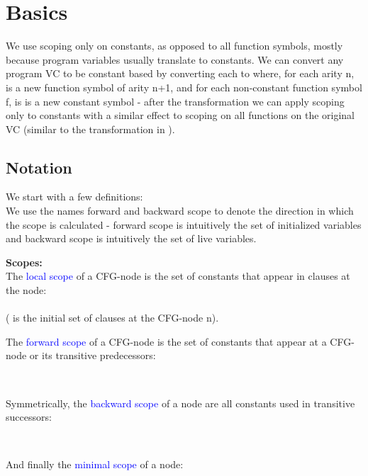 \section{Basics}
We use scoping only on constants, as opposed to all function symbols, mostly because program variables usually translate to constants.
We can convert any program VC to be constant based by converting each  to  where, for each arity n,  is a new function symbol of arity n+1, and for each non-constant function symbol f,  is is a new constant symbol - after the transformation we can apply scoping only to constants with a similar effect to scoping on all functions on the original VC (similar to the transformation in \cite{NieuwenhuisOliveras03}).

\subsection{Notation}
We start with a few definitions:\\
We use the names forward and backward scope to denote the direction in which the scope is calculated - forward scope is intuitively the set of initialized variables and backward scope is intuitively the set of live variables.

\noindent
\textbf{Scopes:}\\
The \textcolor{blue}{local scope} of a CFG-node is the set of constants that appear in clauses at the node:\\
\\
( is the initial set of clauses at the CFG-node n).

The \textcolor{blue}{forward scope} of a CFG-node is the set of constants that appear at a CFG-node or its transitive predecessors:

\bigskip
{}\\
\bigskip

\noindent
Symmetrically,  the \textcolor{blue}{backward scope} of a node are all constants used in transitive successors:

\bigskip
{}\\
\bigskip

\noindent
And finally the \textcolor{blue}{minimal scope} of a node:

